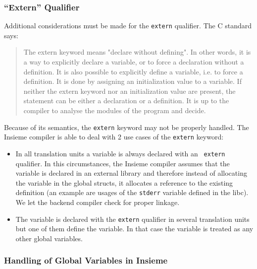 \subsubsection{``Extern'' Qualifier}

Additional considerations must be made for the {\tt extern} qualifier. The C
standard says:
\begin{quotation}
\small
The extern keyword means "declare without defining". In other words, it is a way
to explicitly declare a variable, or to force a declaration without a
definition. It is also possible to explicitly define a variable, i.e. to force a
definition. It is done by assigning an initialization value to a variable. If
neither the extern keyword nor an initialization value are present, the
statement can be either a declaration or a definition. It is up to the compiler
to analyse the modules of the program and decide. 
\end{quotation}

Because of its semantics, the {\tt extern} keyword may not be properly handled.
The Insieme compiler is able to deal with 2 use cases of the {\tt extern}
keyword:
\begin{itemize}
\item In all translation units a variable is always declared with an {\tt
extern} qualifier. In this circumstances, the Insieme compiler assumes that the
variable is declared in an external library and therefore instead of allocating
the variable in the global structs, it allocates a reference to the existing
definition (an example are usages of the {\tt stderr} variable defined in the
libc). We let the backend compiler check for proper linkage. 

\item The variable is declared with the {\tt extern} qualifier in several
translation units but one of them define the variable. In that case the variable
is treated as any other global variables.
\end{itemize}

\subsubsection{Handling of Global Variables in Insieme}

